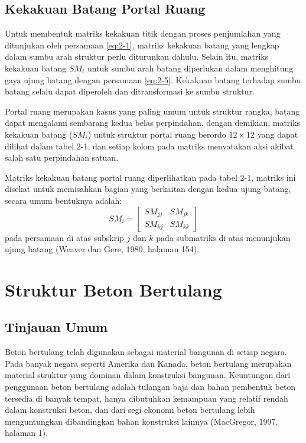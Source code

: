 \subsection{Kekakuan Batang Portal Ruang}
\label{sec:kekakuan-batang}

Untuk membentuk matriks kekakuan titik dengan proses penjumlahan yang
ditunjukan oleh persamaan \eqref{eq:2-1}, matriks kekakuan batang yang
lengkap dalam sumbu arah struktur perlu diturunkan dahulu. Selain itu,
matriks kekakuan batang $SM_i$ untuk sumbu arah batang diperlukan dalam
menghitung gaya ujung batang dengan persamaan \eqref{eq:2-5}. Kekakuan
batang terhadap sumbu batang selalu dapat diperoleh dan ditransformasi ke
sumbu struktur.

Portal ruang merupakan kasus yang paling umum untuk struktur rangka,
batang dapat mengalami sembarang kedua belas perpindahan, dengan demikian,
matriks kekakuan batang ($SM_i$) untuk struktur portal ruang berordo
$12 \times 12$ yang dapat dilihat dalam tabel 2-1, dan setiap kolom pada
matriks menyatakan aksi akibat salah satu perpindahan satuan.

Matriks kekakuan batang portal ruang diperlihatkan pada tabel 2-1, matriks
ini disekat untuk memisahkan bagian yang berkaitan dengan kedua ujung
batang, secara umum bentuknya adalah:
\begin{equation}
SM_i = \begin{bmatrix} SM_{jj} & SM_{jk} \\ SM_{kj} & SM_{kk} \end{bmatrix}
\label{eq:2-6}
\end{equation}
pada persamaan di atas subskrip $j$ dan $k$ pada submatriks di atas
menunjukan ujung batang (Weaver dan Gere, 1980, halaman 154).



\section{Struktur Beton Bertulang}

\subsection{Tinjauan Umum}

Beton bertulang telah digunakan sebagai material bangunan di setiap negara.
Pada banyak negara seperti Amerika dan Kanada, beton bertulang merupakan
material struktur yang dominan dalam konstruksi bangunan. Keuntungan dari
penggunaan beton bertulang adalah tulangan baja dan bahan pembentuk beton
tersedia di banyak tempat, hanya dibutuhkan kemampuan yang relatif rendah
dalam konstruksi beton, dan dari segi ekonomi beton bertulang lebih
menguntungkan dibandingkan bahan konstruksi lainnya (MacGregor, 1997,
halaman 1).

